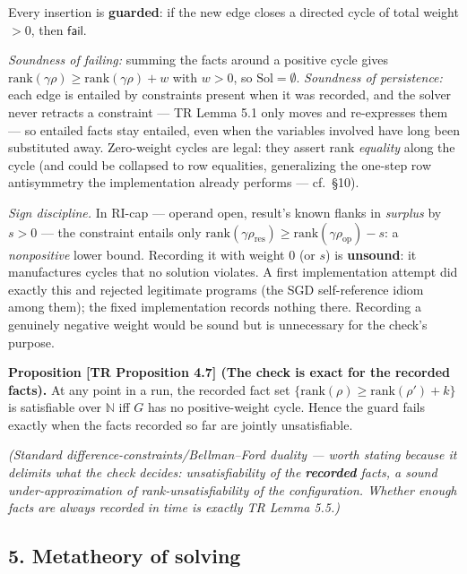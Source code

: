 \documentclass[
  10pt,
  letterpaper,
]{article}
\begin{document}
Every insertion is \textbf{guarded}: if the new edge closes a directed
cycle of total weight \(> 0\), then \(\mathsf{fail}\).

\emph{Soundness of failing:} summing the facts around a positive cycle
gives \(\mathrm{rank}(\gamma\rho) \ge \mathrm{rank}(\gamma\rho) + w\)
with \(w > 0\), so \(\mathrm{Sol} = \emptyset\). \emph{Soundness of
persistence:} each edge is entailed by constraints present when it was
recorded, and the solver never retracts a constraint --- TR Lemma 5.1
only moves and re-expresses them --- so entailed facts stay entailed,
even when the variables involved have long been substituted away.
Zero-weight cycles are legal: they assert rank \emph{equality} along the
cycle (and could be collapsed to row equalities, generalizing the
one-step row antisymmetry the implementation already performs ---
cf.~§10).

\emph{Sign discipline.} In RI-cap --- operand open, result's known
flanks in \emph{surplus} by \(s > 0\) --- the constraint entails only
\(\mathrm{rank}(\gamma\rho_{\mathrm{res}}) \ge \mathrm{rank}(\gamma\rho_{\mathrm{op}}) - s\):
a \emph{nonpositive} lower bound. Recording it with weight \(0\) (or
\(s\)) is \textbf{unsound}: it manufactures cycles that no solution
violates. A first implementation attempt did exactly this and rejected
legitimate programs (the SGD self-reference idiom among them); the fixed
implementation records nothing there. Recording a genuinely negative
weight would be sound but is unnecessary for the check's purpose.

\textbf{Proposition {[}TR Proposition 4.7{]} (The check is exact for the
recorded facts).} At any point in a run, the recorded fact set
\(\{\mathrm{rank}(\rho) \ge \mathrm{rank}(\rho') + k\}\) is satisfiable
over \(\mathbb{N}\) iff \(G\) has no positive-weight cycle. Hence the
guard fails exactly when the facts recorded so far are jointly
unsatisfiable.

\emph{(Standard difference-constraints/Bellman--Ford duality --- worth
stating because it delimits what the check decides: unsatisfiability of
the \textbf{recorded} facts, a sound under-approximation of
rank-unsatisfiability of the configuration. Whether enough facts are
always recorded in time is exactly TR Lemma 5.5.)}

\subsection{5. Metatheory of solving}\label{metatheory-of-solving}
\end{document}
